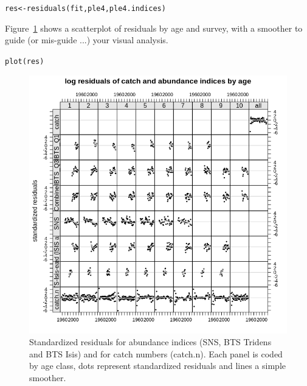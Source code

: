 \documentclass[a4paper,english,10pt]{article}\usepackage[]{graphicx}\usepackage[]{color}
\makeatletter
\newcommand{\hlstd}[1]{\textcolor[rgb]{0.196,0.196,0.196}{#1}}%
\newcommand{\hlkwb}[1]{\textcolor[rgb]{0.627,0,0.314}{#1}}%
\newcommand{\hlkwd}[1]{\textcolor[rgb]{0.78,0.227,0.412}{#1}}%
\newenvironment{kframe}{%
 \def\at@end@of@kframe{}%
 \ifinner\ifhmode%
  \def\at@end@of@kframe{\end{minipage}}%
  \begin{minipage}{\columnwidth}%
 \fi\fi%
 \def\FrameCommand##1{\hskip\@totalleftmargin \hskip-\fboxsep
 \colorbox{shadecolor}{##1}\hskip-\fboxsep
     \hskip-\linewidth \hskip-\@totalleftmargin \hskip\columnwidth}%
 \MakeFramed {\advance\hsize-\width
   \@totalleftmargin\z@ \linewidth\hsize
   \@setminipage}}%
 {\par\unskip\endMakeFramed%
 \at@end@of@kframe}
\newenvironment{knitrout}{}{} %
\makeatother
\begin{document}
\begin{knitrout}
\color{fgcolor}\begin{kframe}
\begin{alltt}
\hlstd{res} \hlkwb{<-} \hlkwd{residuals}\hlstd{(fit, ple4, ple4.indices)}
\end{alltt}
\end{kframe}
\end{knitrout}

Figure~\ref{fig:res} shows a scatterplot of residuals by age and survey, with a smoother to guide (or mis-guide ...) your visual analysis.

\begin{knitrout}
\color{fgcolor}\begin{kframe}
\begin{alltt}
\hlkwd{plot}\hlstd{(res)}
\end{alltt}
\end{kframe}\begin{figure}[H]

{\centering \includegraphics[width=.9\linewidth]{figure/res-1} 

}

\caption[Standardized residuals for abundance indices (SNS, BTS Tridens and BTS Isis) and for catch numbers (catch.n)]{Standardized residuals for abundance indices (SNS, BTS Tridens and BTS Isis) and for catch numbers (catch.n). Each panel is coded by age class, dots represent standardized residuals and lines a simple smoother.}\label{fig:res}
\end{figure}


\end{knitrout}
\end{document}

